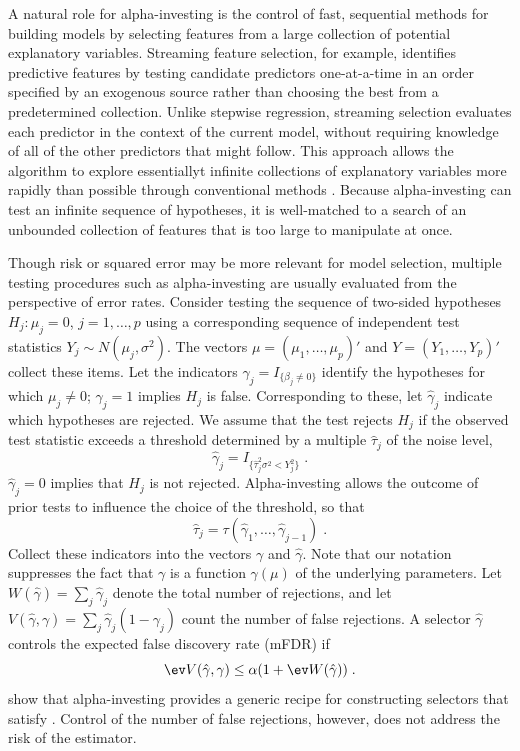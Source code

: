 \documentclass[12pt]{article}
\begin{document}
 
 A natural role for alpha-investing is the control of fast, sequential methods
 for building models by selecting features from a large collection of potential
 explanatory variables.  Streaming feature selection, for example, identifies
 predictive features by testing candidate predictors one-at-a-time in an order
 specified by an exogenous source rather than choosing the best from a
 predetermined collection.  Unlike stepwise regression, streaming selection
 evaluates each predictor in the context of the current model, without requiring
 knowledge of all of the other predictors that might follow.  This approach
 allows the algorithm to explore essentiallyt infinite collections of
 explanatory variables more rapidly than possible through conventional methods
 \citep{fosterlin10, langford}.  Because alpha-investing can test an infinite
 sequence of hypotheses, it is well-matched to a search of an unbounded
 collection of features that is too large to manipulate at once.


 Though risk or squared error may be more relevant for model selection, multiple
 testing procedures such as alpha-investing are usually evaluated from the
 perspective of error rates.  Consider testing the sequence of two-sided
 hypotheses $H_j: \mu_j = 0$, $j = 1,\ldots, p$ using a corresponding sequence
 of independent test statistics $Y_j \sim N(\mu_j, \sigma^2)$.  The vectors $\mu =
 (\mu_1,\ldots,\mu_p)'$ and $Y = (Y_1,\ldots,Y_p)'$ collect these items.  Let
 the indicators $\gamma_j = I_{\{\beta_j\ne 0\}}$ identify the hypotheses for
 which $\mu_j \ne 0$; $\gamma_j = 1$ implies $H_j$ is false.  Corresponding to
 these, let $\hat\gamma_j$ indicate which hypotheses are rejected.  We assume
 that the test rejects $H_j$ if the observed test statistic exceeds a threshold
 determined by a multiple $\hat\tau_j$ of the noise level,
 \begin{equation}
    \hat\gamma_j = I_{\{\hat\tau_j^2 \sigma^2 < Y_j^2\}} \;.  
 \label{eq:gammahat}
 \end{equation}
  $\hat\gamma_j = 0$ implies that $H_j$ is not rejected.  Alpha-investing allows
 the outcome of prior tests to influence the choice of the threshold, so that
 \begin{equation}
   \hat\tau_j = \tau(\hat\gamma_1, \ldots, \hat\gamma_{j-1}) \;.   
 \label{eq:tauhat}
 \end{equation}
 Collect these indicators into the vectors $\gamma$ and $\hat\gamma$.  Note that
 our notation suppresses the fact that $\gamma$ is a function $\gamma(\mu)$ of
 the underlying parameters.  Let $W(\hat\gamma) = \sum_j \hat\gamma_j$ denote
 the total number of rejections, and let $V(\hat\gamma, \gamma) = \sum_j
 \hat\gamma_j (1-\gamma_j)$ count the number of false rejections.  A selector
 $\hat\gamma$ controls the expected false discovery rate (mFDR) if
 \begin{equation}
     \ev V(\hat\gamma, \gamma) \le \alpha(1 + \ev W(\hat\gamma)) \;.
 \label{eq:mfdr}
 \end{equation}
 \citet{fosterstine08} show that alpha-investing provides a generic recipe for
 constructing selectors that satisfy .  Control of the number of
 false rejections, however, does not address the risk of the estimator.  
\end{document}
